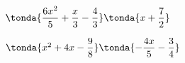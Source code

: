 \begin{esercizio}
\begin{enumeratea}
{}\)
\item \(\tonda{\dfrac{6 x^{2}}{5} + \dfrac{x}{3} - 
\dfrac{4}{3}}\tonda{x + \dfrac{7}{2}}\)
\item \(\tonda{x^{2} + 4 x - \dfrac{9}{8}}\tonda{- \dfrac{4 x}{5} - 
\dfrac{3}{4}}\)

\end{enumeratea}
\end{esercizio}
